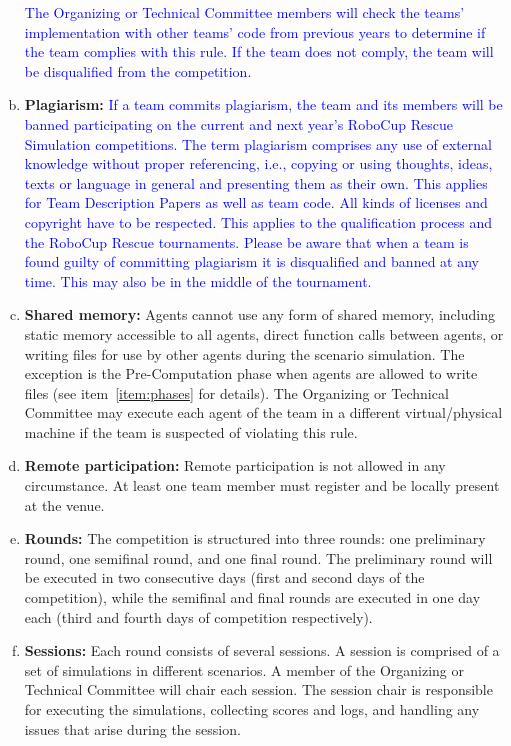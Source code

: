 \documentclass{article}
\begin{document}
\begin{enumerate}[(a)]
\textcolor{blue}{The Organizing or Technical Committee members will check the teams' implementation with other teams' code from previous years to determine if the team complies with this rule. If the team does not comply, the team will be disqualified from the competition.}
\item \textbf{Plagiarism:} \textcolor{blue}{If a team commits plagiarism, the team and its members will be banned participating on the current and next year's RoboCup Rescue Simulation competitions. The term plagiarism comprises any use of external knowledge without proper referencing, i.e., copying or using thoughts, ideas, texts or language in general and presenting them as their own. This applies for Team Description Papers as well as team code. All kinds of licenses and copyright have to be respected. This applies to the qualification process and the RoboCup Rescue tournaments. Please be aware that when a team is found guilty of committing plagiarism it is disqualified and banned at any time. This may also be in the middle of the tournament.}
\item \textbf{Shared memory:} Agents cannot use any form of shared memory, including static memory accessible to all agents, direct function calls between agents, or writing files for use by other agents during the scenario simulation. The exception is the Pre-Computation phase when agents are allowed to write files (see item~\ref{item:phases} for details). The Organizing or Technical Committee may execute each agent of the team in a different virtual/physical machine if the team is suspected of violating this rule.
\item \textbf{Remote participation:} Remote participation is not allowed in any circumstance. At least one team member must register and be locally present at the venue.
\item \textbf{Rounds:} The competition is structured into three rounds: one preliminary round, one semifinal round, and one final round. The preliminary round will be executed in two consecutive days (first and second days of the competition), while the semifinal and final rounds are executed in one day each (third and fourth days of competition respectively).
\item \textbf{Sessions:} Each round consists of several sessions. A session is comprised of a set of simulations in different scenarios. A member of the Organizing or Technical Committee will chair each session. The session chair is responsible for executing the simulations, collecting scores and logs, and handling any issues that arise during the session.

\end{enumerate}
\end{document}
